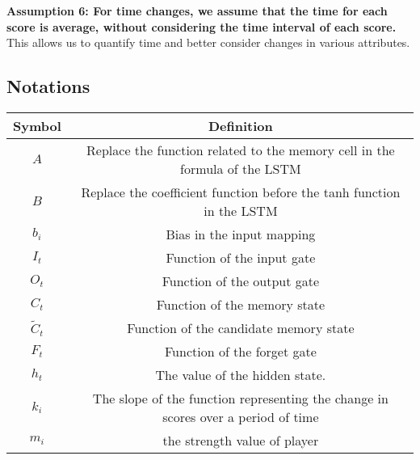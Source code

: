\textbf{Assumption 6: For time changes, we assume that the time for each score is average, without considering the time interval of each score.} This allows us to quantify time and better consider changes in various attributes.


\subsection{Notations}
\begin{table}[h]
	\begin{center}
		\begin{tabular}{cc}
			\toprule[1.5pt]
			Symbol&Definition\\
			\midrule[1pt]
			\(A\) & Replace the function related to the memory cell in the formula of the LSTM\\
                \(B\) &  Replace the coefficient function before the tanh function in the LSTM \\
                \(b_i\) & Bias in the input mapping\\
                \(I_t\) & Function of the input gate\\
                \(O_t\) & Function of the output gate\\
                \(C_t\) & Function of the memory state\\
                \({\tilde C_{t}}\) & Function of the candidate memory state\\
                \(F_t\) & Function of the forget gate\\
                \(h_t\) & The value of the hidden state.\\
                \(k_i\) & The slope of the function representing the change in scores over a period of time\\
                \(m_i\) & the strength value of player \\
                

\end{tabular}
\end{center}
\end{table}
